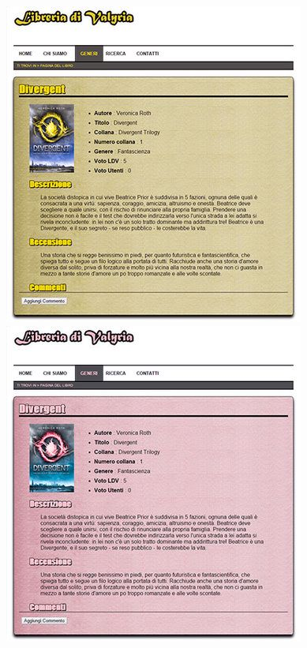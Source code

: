 \begin{figure}[H]
\begin{minipage}{0.45\textwidth}
\end{minipage}
\vspace*{0.5cm}
\begin{minipage}{0.45\textwidth}
\includegraphics[width=\linewidth]{images/screen/protanope.jpg}
\end{minipage}
\hspace{\fill}
\begin{minipage}{0.45\textwidth}
\includegraphics[width=\linewidth]{images/screen/tritanope.jpg}

\end{minipage}
\end{figure}
